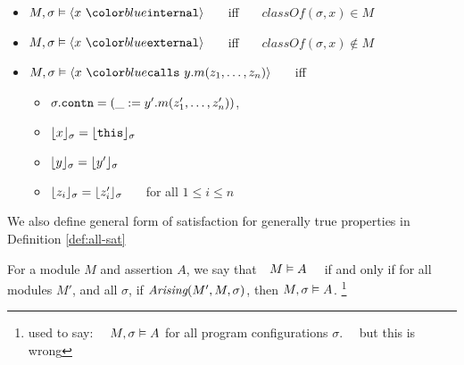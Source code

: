 \begin{definition}
\begin{itemize}
\begin{itemize}
\end{itemize}
\item
$\satisfiesA{M}{\sigma}{\internal{x}}$ \ \ \ iff \ \ \  
$\textit{classOf}(\sigma,x) \in M$
\item
$\satisfiesA{M}{\sigma}{\external{x}}$ \ \ \ iff \ \ \  
$\textit{classOf}(\sigma,x) \not\in M$
\item
$\satisfiesA{M}{\sigma}{\calls{x}{y}{m}{z_1, \ldots, z_n}}$ \ \ \ iff \ \ \ 
\begin{itemize}
\item
$\sigma.{\texttt{contn}} = (\_ := y'.m(z'_1,\ldots,z'_n))$, %
\item
$\lfloor x \rfloor_{\sigma} = \lfloor {\texttt{this}} \rfloor_{\sigma}$  %
\item
${{\lfloor y \rfloor_{\sigma} = \lfloor y' \rfloor_{\sigma}}}$ %
\item
$\lfloor z_i \rfloor_{\sigma} = \lfloor z'_i \rfloor_{\sigma}$ \ \ \ for all $1\!\leq i\!\leq n$
\end{itemize}
\end{itemize}
\end{definition}




We also define general form of satisfaction for generally true properties in 
Definition \ref{def:all-sat}
\begin{definition}%
\label{def:all-sat}
For a module $M$ and assertion $A$, we say that\ \  $M \vDash A$ \ \ if and only if 
for all modules $M'$, and all $\sigma$, if $\textit{Arising}(M', M, \sigma)$, then $M , \sigma \vDash A$.
\footnote{used to say: \ \ $M , \sigma \vDash A$ for all program configurations $\sigma$. \ \  
but this is wrong }
\end{definition}

